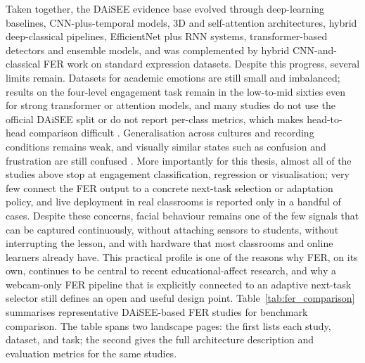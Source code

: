 Taken together, the DAiSEE evidence base evolved through deep-learning baselines, CNN-plus-temporal models, 3D and self-attention architectures, hybrid deep-classical pipelines, EfficientNet plus RNN systems, transformer-based detectors and ensemble models, and was complemented by hybrid CNN-and-classical FER work on standard expression datasets. Despite this progress, several limits remain. Datasets for academic emotions are still small and imbalanced; results on the four-level engagement task remain in the low-to-mid sixties even for strong transformer or attention models, and many studies do not use the official DAiSEE split or do not report per-class metrics, which makes head-to-head comparison difficult \cite{abedi_improving_2021,santoni_convolutional_2023,rianto_engagement_2025,shiri_detection_2024,su_leveraging_2024}. Generalisation across cultures and recording conditions remains weak, and visually similar states such as confusion and frustration are still confused \cite{lek_academic_2023,florestiyanto_emotion_2024,vistorte_integrating_2024}. More importantly for this thesis, almost all of the studies above stop at engagement classification, regression or visualisation; very few connect the FER output to a concrete next-task selection or adaptation policy, and live deployment in real classrooms is reported only in a handful of cases. Despite these concerns, facial behaviour remains one of the few signals that can be captured continuously, without attaching sensors to students, without interrupting the lesson, and with hardware that most classrooms and online learners already have. This practical profile is one of the reasons why FER, on its own, continues to be central to recent educational-affect research, and why a webcam-only FER pipeline that is explicitly connected to an adaptive next-task selector still defines an open and useful design point. Table~\ref{tab:fer_comparison} summarises representative DAiSEE-based FER studies for benchmark comparison. The table spans two landscape pages: the first lists each study, dataset, and task; the second gives the full architecture description and evaluation metrics for the same studies.




